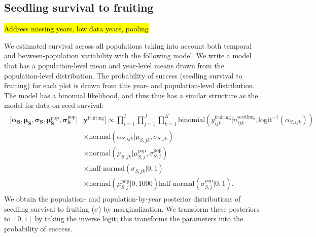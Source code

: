 \documentclass[12pt, oneside, titlepage]{article}   	%
\begin{document}
\subsection{Seedling survival to fruiting}

\hl{Address missing years, low data years, pooling}

We estimated survival across all populations taking into account both temporal and between-population variability with the following model. We write a model that has a population-level mean and year-level means drawn from the population-level distribution. The probability of success (seedling survival to fruiting) for each plot is drawn from this year- and population-level distribution. The model has a binomial likelihood, and thus thus has a similar structure as the model for data on seed survival:
%
\begin{align}
  \begin{split}
 [  \bm{\alpha_S} , \bm{\mu_S} , \bm{\sigma_S} , \bm{\mu^\mathrm{pop}_S}, \bm{\sigma^\mathrm{pop}_S} | & \bm{y^{\mathrm{fruiting}}}  ] \propto \prod_{i=1}^{I}   \prod_{j=1}^{J}  \prod_{k=1}^{K} 
   \mathrm{binomial} ( y^{\mathrm{fruiting}}_{ijk} | n^\mathrm{seedling}_{ijk}, \mathrm{logit}^{-1}( \alpha_{S,ijk} ) ) 
   \\ & \times \mathrm{normal} ( \alpha_{S,ijk}  | \mu_{S,jk}, \sigma{_{S,jk} })
  \\ & \times \mathrm{normal} ( \mu_{S,jk}  | \mu^\mathrm{pop}_{S,j}, \sigma^\mathrm{pop}_{S,j} )
  \\ & \times \textrm{half-normal} ( \sigma_{S,jk} | 0,1)
  \\ & \times \mathrm{normal} ( \mu^\mathrm{pop}_{S,j} | 0 , 1000 ) \textrm{half-normal} ( \sigma^\mathrm{pop}_{S,j} | 0,1).
  \end{split}
\end{align}
%
We obtain the population- and population-by-year posterior distributions of seedling survival to fruiting ($\sigma$) by marginalization. We transform these posteriors to $[0,1]$ by taking the inverse logit; this transforms the parameters into the probability of success.
\end{document}
